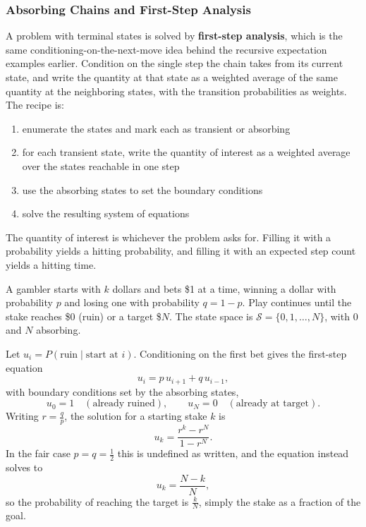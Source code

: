 \subsubsection{Absorbing Chains and First-Step Analysis}

A problem with terminal states is solved by \textbf{first-step analysis}, which is the same conditioning-on-the-next-move idea behind the recursive expectation examples earlier. Condition on the single step the chain takes from its current state, and write the quantity at that state as a weighted average of the same quantity at the neighboring states, with the transition probabilities as weights. The recipe is:
\begin{enumerate}[itemsep=-1ex]
  \item enumerate the states and mark each as transient or absorbing
  \item for each transient state, write the quantity of interest as a weighted average over the states reachable in one step
  \item use the absorbing states to set the boundary conditions
  \item solve the resulting system of equations
\end{enumerate}
The quantity of interest is whichever the problem asks for. Filling it with a probability yields a hitting probability, and filling it with an expected step count yields a hitting time.

\newpage

\begin{example}
A gambler starts with $k$ dollars and bets \$1 at a time, winning a dollar with probability $p$ and losing one with probability $q = 1-p$. Play continues until the stake reaches \$0 (ruin) or a target \$$N$. The state space is $\mathcal{S} = \{0, 1, \dots, N\}$, with $0$ and $N$ absorbing.

Let $u_i = P(\text{ruin} \mid \text{start at } i)$. Conditioning on the first bet gives the first-step equation
\[
u_i = p\, u_{i+1} + q\, u_{i-1},
\]
with boundary conditions set by the absorbing states,
\[
u_0 = 1 \quad (\text{already ruined}), \qquad u_N = 0 \quad (\text{already at target}).
\]
Writing $r = \frac{q}{p}$, the solution for a starting stake $k$ is
\[
u_k = \frac{r^k - r^N}{1 - r^N}.
\]
In the fair case $p = q = \tfrac{1}{2}$ this is undefined as written, and the equation instead solves to
\[
u_k = \frac{N - k}{N},
\]
so the probability of reaching the target is $\frac{k}{N}$, simply the stake as a fraction of the goal.
\end{example}

